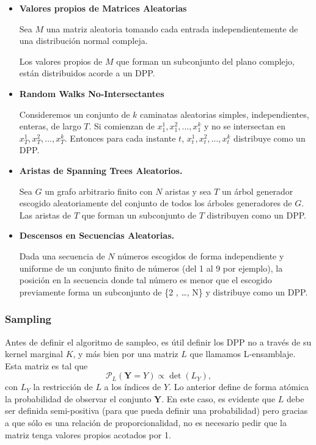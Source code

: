 \begin{itemize}
    \item \textbf{Valores propios de Matrices Aleatorias} \cite{MEHTA1960420}\cite{doi:10.1063/1.1704292}
    
    Sea $M$ una matriz aleatoria tomando cada entrada independientemente de una distribución normal compleja. 

    Los valores propios de $M$ que forman un subconjunto del plano complejo, están distribuidos acorde a un DPP. 
    
    \item \textbf{Random Walks No-Intersectantes} \cite{Johansson_2004} 
    
    Consideremos un conjunto de $k$ caminatas aleatorias simples, independientes, enteras, de largo $T$. Si comienzan de  $x_{1}^{1} , x_{1}^{2} , \dots , x_{1}^{k}$ y no se intersectan en $x_{T}^{1} , x_{T}^{2} , \dots , x_{T}^{k}$. Entonces para cada instante $t$, $x_{t}^{1} , x_{t}^{2} , \dots , x_{t}^{k}$ distribuye como un DPP.
    
    \item \textbf{Aristas de Spanning Trees Aleatorios. }\cite{https://doi.org/10.48550/arxiv.math/0404048}
    
    Sea $G$ un grafo arbitrario finito con $N$ aristas y sea $T$ un árbol generador escogido aleatoriamente del conjunto de todos los árboles generadores de $G$. Las aristas de $T$ que forman un subconjunto de $T$ distribuyen como un DPP.  
    
    \item \textbf{Descensos en Secuencias Aleatorias. } \cite{https://doi.org/10.48550/arxiv.0904.3740}

    Dada una secuencia de $N$ números escogidos de forma independiente y uniforme de un conjunto finito de números (del 1 al 9 por ejemplo), la posición en la secuencia donde tal número es menor que el escogido previamente forma un subconjunto de \{2 , \dots , N\} y distribuye como un DPP.
    
\end{itemize}

\subsubsection{Sampling}

Antes de definir el algoritmo de sampleo, es útil definir los DPP no a través de su kernel marginal $K$, y más bien por una matriz $L$ que llamamos L-ensamblaje. Esta matriz es tal que 
\[ \mathcal{P}_{L}(\textbf{Y} = Y) \propto \det(L_Y) ,  \]
con $L_Y$ la restricción de $L$ a los índices de $Y$. Lo anterior define de forma atómica la probabilidad de observar el conjunto $\mathbf{Y}$. En este caso, es evidente que $L$ debe ser definida semi-positiva (para que pueda definir una probabilidad) pero gracias a que sólo es una relación de proporcionalidad, no es necesario pedir que la matriz tenga valores propios acotados por 1. 

